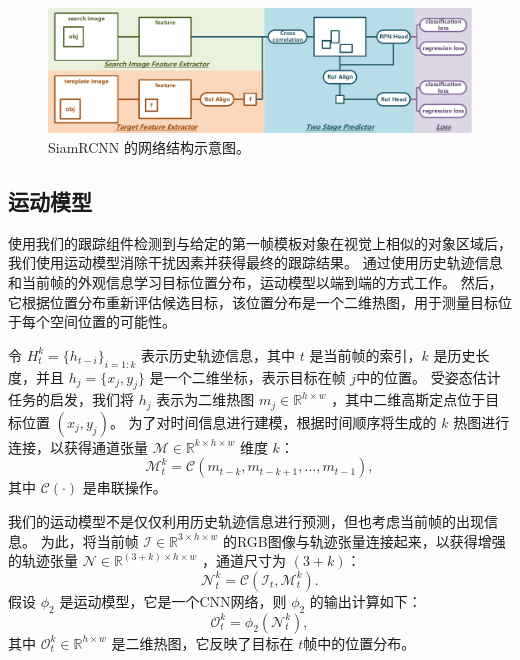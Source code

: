 \begin{figure}
    \centering
    \includegraphics[width=1.0\textwidth]{Img/globally/SiamRCNN.pdf}
    \caption{SiamRCNN 的网络结构示意图。}
    \label{fig:siamrcnn}
\end{figure}

\subsection{运动模型} 使用我们的跟踪组件检测到与给定的第一帧模板对象在视觉上相似的对象区域后，我们使用运动模型消除干扰因素并获得最终的跟踪结果。
通过使用历史轨迹信息和当前帧的外观信息学习目标位置分布，运动模型以端到端的方式工作。
然后，它根据位置分布重新评估候选目标，该位置分布是一个二维热图，用于测量目标位于每个空间位置的可能性。

令 $H_{t}^{k} = \{h_{t-i}\}_{i=1:k}$ 表示历史轨迹信息，其中 $t$ 是当前帧的索引，$k$ 是历史长度，并且 $h_{j} = \{x_{j}, y_{j}\}$ 是一个二维坐标，表示目标在帧 $j$中的位置。
受姿态估计任务的启发，我们将 $h_{j}$ 表示为二维热图 $m_{j} \in \mathbb R^{h \times w}$ ，其中二维高斯定点位于目标位置 $(x_{j}, y_{j})$。
为了对时间信息进行建模，根据时间顺序将生成的 $k$ 热图进行连接，以获得通道张量 $\mathcal{M} \in \mathbb{R}^{k \times h \times w}$ 维度 $k$：
\begin{equation}
    \mathcal{M}_{t}^{k} = \mathcal{C}(m_{t-k}, m_{t-k+1}, ..., m_{t-1}),
\end{equation}
其中 $\mathcal{C}(\cdot)$ 是串联操作。

我们的运动模型不是仅仅利用历史轨迹信息进行预测，但也考虑当前帧的出现信息。
为此，将当前帧 $\mathcal{I} \in \mathbb{R}^{3 \times h \times w}$ 的RGB图像与轨迹张量连接起来，以获得增强的轨迹张量 $\mathcal{N} \in \mathbb{R}^{(3+k) \times h \times w}$ ，通道尺寸为 $(3+k)$：
\begin{equation}
    \mathcal{N}_{t}^{k} = \mathcal{C}(\mathcal{I}_{t}, \mathcal{M}_{t}^{k}).
\end{equation}
假设 $\phi_{2}$ 是运动模型，它是一个CNN网络，则 $\phi_{2}$ 的输出计算如下：
\begin{equation}
    \mathcal{O}_{t}^{k} = \phi_{2}(\mathcal{N}_{t}^{k}),
\end{equation}
其中 $\mathcal{O}_{t}^{k} \in \mathbb{R}^{h \times w}$ 是二维热图，它反映了目标在 $t$帧中的位置分布。

